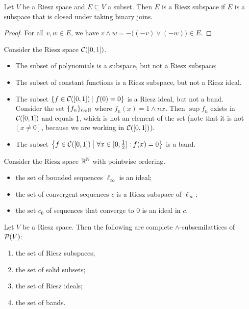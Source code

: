 \begin{lemma} \label{RieszSubspaceJoinClosure}
Let $V$ be a Riesz space and $E\subseteq V$ a subset. Then $E$ is a Riesz subspace if $E$ is a subspace that is closed under taking binary joins.
\end{lemma}
\begin{proof}
For all $v,w\in E$, we have $v\wedge w = -\big((-v)\vee (-w)\big)\in E$.
\end{proof}

\begin{example}
Consider the Riesz space $\cont(\interval{0,1})$.
\begin{itemize}
\item The subset of polynomials is a subspace, but not a Riesz subspace;
\item The subset of constant functions is a Riesz subspace, but not a Riesz ideal.
\item The subset $\setbuilder{f\in \cont(\interval{0,1})}{f(0) = 0}$ is a Riesz ideal, but not a band. Consider the set $\{f_n\}_{n\in\mathbb{N}}$ where $f_n(x) = 1 \wedge nx$. Then $\sup f_n$ exists in $\cont(\interval{0,1})$ and equals $\underline{1}$, which is not an element of the set (note that it is not $[x\neq 0]$, because we are working in $\cont(\interval{0,1})$).
\item The subset $\setbuilder{f\in \cont(\interval{0,1})}{\forall x\in \interval{0,\frac{1}{2}}: f(x) = 0}$ is a band. 
\end{itemize}
Consider the Riesz space $\mathbb{R}^{\mathbb{N}}$ with pointwise ordering.
\begin{itemize}
\item the set of bounded sequences $\ell_\infty$ is an ideal;
\item the set of convergent sequences $c$ is a Riesz subspace of $\ell_\infty$;
\item the set $c_0$ of sequences that converge to $0$ is an ideal in $c$.
\end{itemize}
\end{example}

\begin{proposition} \label{RieszSpaceIntersectionSystems}
Let $V$ be a Riesz space. Then the following are complete $\wedge$-subsemilattices of $\operatorname{\mathcal{P}}(V)$:
\begin{enumerate}
\item the set of Riesz subspaces;
\item the set of solid subsets;
\item the set of Riesz ideals;
\item the set of bands.
\end{enumerate}
\end{proposition}

